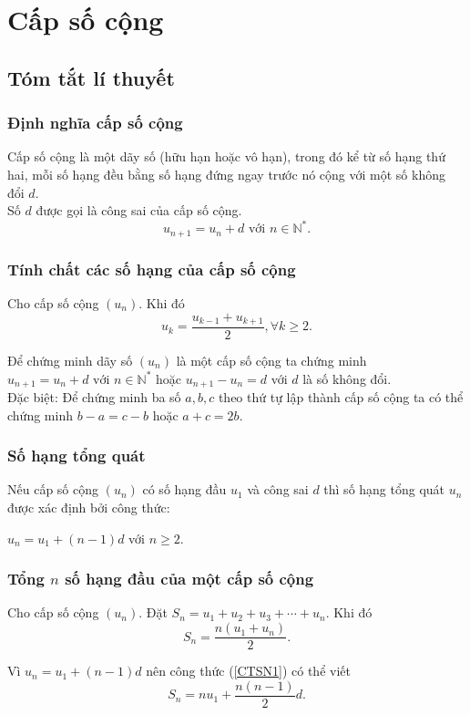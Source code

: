 \newpage

\section{Cấp số cộng}

\subsection{Tóm tắt lí thuyết}
\subsubsection{Định nghĩa cấp số cộng}
Cấp số cộng là một dãy số (hữu hạn hoặc vô hạn), trong đó kể từ số hạng thứ hai, mỗi số hạng đều bằng số hạng đứng ngay trước nó cộng với một số không đổi $d$.\\
Số $d$ được gọi là công sai của cấp số cộng.
$$u_{n+1}=u_n + d \text{ với } n\in \mathbb{N^*}.$$

\subsubsection{Tính chất các số hạng của cấp số cộng}
\begin{dl}
	Cho cấp số cộng $(u_n)$. Khi đó
	$$u_k=\dfrac{u_{k-1}+u_{k+1}}{2}, \forall k\geq 2.$$
\end{dl}
\begin{note}
	Để chứng minh dãy số $(u_n)$ là một cấp số cộng ta chứng minh $u_{n+1}=u_n + d \text{ với } n\in \mathbb{N^*}$ hoặc $u_{n+1} - u_n = d$ với $d$ là số không đổi.\\
	Đặc biệt: Để chứng minh ba số $a, b, c$ theo thứ tự lập thành cấp số cộng ta có thể chứng minh $b-a = c-b$ hoặc $a+c=2b$.
\end{note}

\subsubsection{Số hạng tổng quát}
\begin{dl}
	Nếu cấp số cộng $(u_n)$ có số hạng đầu $u_1$ và công sai $d$ thì số hạng tổng quát $u_n$ được xác định bởi công thức:
	\begin{center}
		$u_n=u_1+(n-1)d$ với $n\geq 2.$ 
	\end{center}
\end{dl}

\subsubsection{Tổng $n$ số hạng đầu của một cấp số cộng}
\begin{dl}
	Cho cấp số cộng $(u_n)$. Đặt $S_n=u_1+u_2+u_3+\cdots +u_n$. Khi đó
	\begin{equation}\label{CTSN1}
	S_n=\dfrac{n(u_1+u_n)}{2}.
	\end{equation}
\end{dl}
\begin{note}
	Vì $u_n=u_1+(n-1)d$ nên công thức (\ref{CTSN1}) có thể viết
	\begin{equation}\label{CTSN2}
	S_n=nu_1+\dfrac{n(n-1)}{2}d.
	\end{equation}
\end{note}
